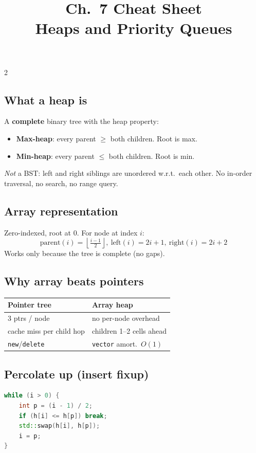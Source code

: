 \documentclass[10pt]{article}
\title{Ch.~7 Cheat Sheet\\\large Heaps and Priority Queues}
\author{}
\date{}
\begin{document}
\maketitle
\vspace{-2em}

\begin{multicols}{2}

\subsection*{What a heap is}
A \textbf{complete} binary tree with the heap property:
\begin{itemize}
    \item \textbf{Max-heap}: every parent $\ge$ both children. Root is max.
    \item \textbf{Min-heap}: every parent $\le$ both children. Root is min.
\end{itemize}
\textit{Not} a BST: left and right siblings are unordered w.r.t.\
each other. No in-order traversal, no search, no range query.

\subsection*{Array representation}
Zero-indexed, root at 0. For node at index $i$:
\[
\text{parent}(i) = \left\lfloor \tfrac{i-1}{2} \right\rfloor,\
\text{left}(i) = 2i+1,\
\text{right}(i) = 2i+2
\]
Works only because the tree is complete (no gaps).

\subsection*{Why array beats pointers}
\begin{tabular}{@{}l|l@{}}
\textbf{Pointer tree}       & \textbf{Array heap}\\
\hline
3 ptrs / node               & no per-node overhead\\
cache miss per child hop    & children 1--2 cells ahead\\
\texttt{new}/\texttt{delete}& \texttt{vector} amort.\ $O(1)$
\end{tabular}

\subsection*{Percolate up (insert fixup)}
\begin{lstlisting}[language=C++]
while (i > 0) {
    int p = (i - 1) / 2;
    if (h[i] <= h[p]) break;
    std::swap(h[i], h[p]);
    i = p;
}
\end{lstlisting}


\end{multicols}
\end{document}
